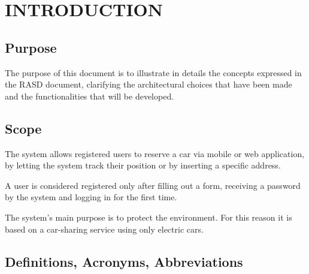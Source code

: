 \section{INTRODUCTION}
\subsection{Purpose}
The purpose of this document is to illustrate in details the concepts expressed in the RASD document, clarifying the architectural choices that have been made and the functionalities that will be developed.
\subsection{Scope}
The system allows registered users to reserve a car via mobile or web application, by letting the system track their position or by inserting a specific address.

A user is considered registered only after filling out a form, receiving a password by the system and logging in for the first time.

The system's main purpose is to protect the environment. For this reason it is based on a car-sharing service using only electric cars.
\newpage 
\subsection{Definitions, Acronyms, Abbreviations} 
